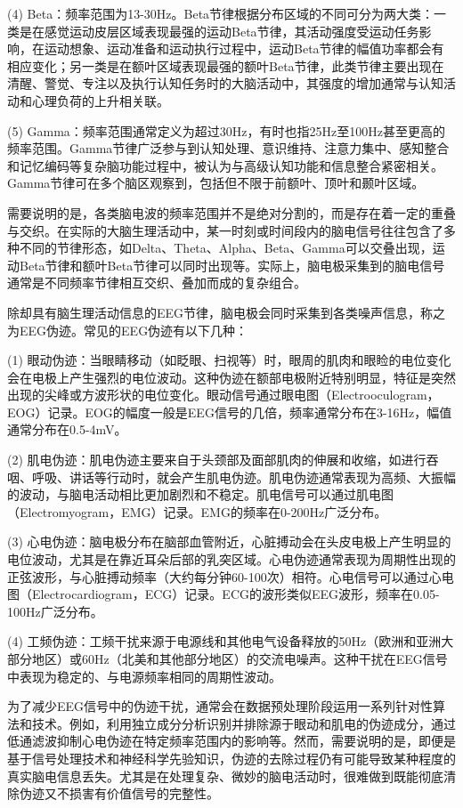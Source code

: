 (4) Beta：频率范围为13-30Hz。Beta节律根据分布区域的不同可分为两大类：一类是在感觉运动皮层区域表现最强的运动Beta节律，其活动强度受运动任务影响，在运动想象、运动准备和运动执行过程中，运动Beta节律的幅值功率都会有相应变化；另一类是在额叶区域表现最强的额叶Beta节律，此类节律主要出现在清醒、警觉、专注以及执行认知任务时的大脑活动中，其强度的增加通常与认知活动和心理负荷的上升相关联。

(5) Gamma：频率范围通常定义为超过30Hz，有时也指25Hz至100Hz甚至更高的频率范围。Gamma节律广泛参与到认知处理、意识维持、注意力集中、感知整合和记忆编码等复杂脑功能过程中，被认为与高级认知功能和信息整合紧密相关。Gamma节律可在多个脑区观察到，包括但不限于前额叶、顶叶和颞叶区域。

需要说明的是，各类脑电波的频率范围并不是绝对分割的，而是存在着一定的重叠与交织。在实际的大脑生理活动中，某一时刻或时间段内的脑电信号往往包含了多种不同的节律形态，如Delta、Theta、Alpha、Beta、Gamma可以交叠出现，运动Beta节律和额叶Beta节律可以同时出现等。实际上，脑电极采集到的脑电信号通常是不同频率节律相互交织、叠加而成的复杂组合。

除却具有脑生理活动信息的EEG节律，脑电极会同时采集到各类噪声信息，称之为EEG伪迹。常见的EEG伪迹有以下几种：

(1) 眼动伪迹：当眼睛移动（如眨眼、扫视等）时，眼周的肌肉和眼睑的电位变化会在电极上产生强烈的电位波动。这种伪迹在额部电极附近特别明显，特征是突然出现的尖峰或方波形状的电位变化。眼动信号通过眼电图（Electrooculogram，EOG）记录。EOG的幅度一般是EEG信号的几倍，频率通常分布在3-16Hz，幅值通常分布在0.5-4mV。

(2) 肌电伪迹：肌电伪迹主要来自于头颈部及面部肌肉的伸展和收缩，如进行吞咽、呼吸、讲话等行动时，就会产生肌电伪迹。肌电伪迹通常表现为高频、大振幅的波动，与脑电活动相比更加剧烈和不稳定。肌电信号可以通过肌电图（Electromyogram，EMG）记录。EMG的频率在0-200Hz广泛分布。

(3) 心电伪迹：脑电极分布在脑部血管附近，心脏搏动会在头皮电极上产生明显的电位波动，尤其是在靠近耳朵后部的乳突区域。心电伪迹通常表现为周期性出现的正弦波形，与心脏搏动频率（大约每分钟60-100次）相符。心电信号可以通过心电图（Electrocardiogram，ECG）记录。ECG的波形类似EEG波形，频率在0.05-100Hz广泛分布。

(4) 工频伪迹：工频干扰来源于电源线和其他电气设备释放的50Hz（欧洲和亚洲大部分地区）或60Hz（北美和其他部分地区）的交流电噪声。这种干扰在EEG信号中表现为稳定的、与电源频率相同的周期性波动。

为了减少EEG信号中的伪迹干扰，通常会在数据预处理阶段运用一系列针对性算法和技术。例如，利用独立成分分析识别并排除源于眼动和肌电的伪迹成分，通过低通滤波抑制心电伪迹在特定频率范围内的影响等。然而，需要说明的是，即便是基于信号处理技术和神经科学先验知识，伪迹的去除过程仍有可能导致某种程度的真实脑电信息丢失。尤其是在处理复杂、微妙的脑电活动时，很难做到既能彻底清除伪迹又不损害有价值信号的完整性。

